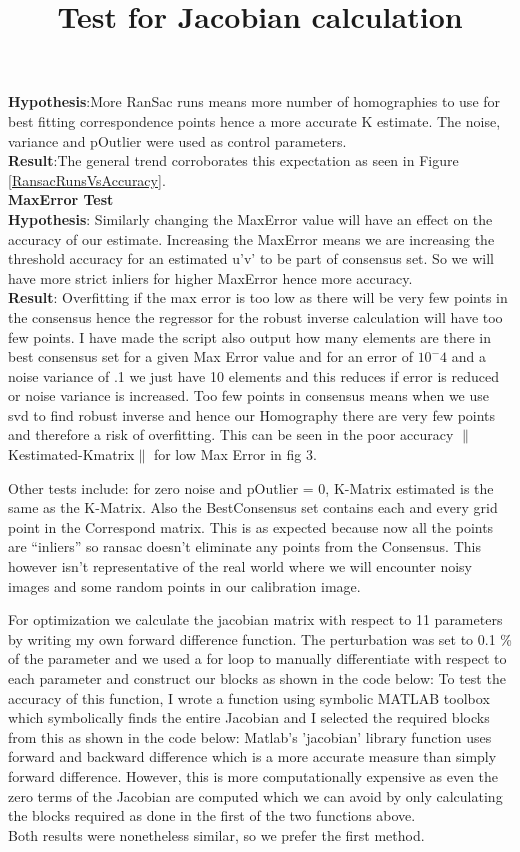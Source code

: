 \documentclass[titlepage]{article}
\begin{document}
\textbf{Hypothesis}:More RanSac runs means more number of homographies to use for best fitting correspondence points hence a more accurate K estimate. The noise, variance and pOutlier were used as control parameters. \\
\textbf{Result}:The general trend corroborates this expectation as seen in Figure \ref{RansacRunsVsAccuracy}.\\
\textbf{MaxError Test}\\
\textbf{Hypothesis}: Similarly changing the MaxError value will have an effect on the accuracy of our estimate. Increasing the MaxError means we are increasing the threshold accuracy for an estimated u'v' to be part of consensus set. So we will have more strict inliers for higher MaxError hence more accuracy.\\
\textbf{Result}: Overfitting if the max error is too low as there will be very few points in the consensus hence the regressor for the robust inverse calculation will have too few points.
I have made the script also output how many elements are there in best consensus set for a given Max Error value and for an error of $10^-4$ and a noise variance of .1 we just have 10 elements and this reduces if error is reduced or noise variance is increased. Too few points in consensus means when we use svd to find robust inverse and hence our Homography there are very few points and therefore a risk of overfitting. This can be seen in the poor accuracy $\|$Kestimated-Kmatrix$\|$ for low Max Error in fig 3.

Other tests include: for zero noise and pOutlier = 0, K-Matrix estimated is the same as the K-Matrix. Also the BestConsensus set contains each and every grid point in the Correspond matrix. This is as expected because now all the points are “inliers” so ransac doesn't eliminate any points from the Consensus. This however isn't representative of the real world where we will encounter noisy images and some random points in our calibration image.\\
\title{Test for Jacobian calculation} 
 For optimization we calculate the jacobian matrix with respect to 11 parameters by writing my own forward difference function. The perturbation was set to 0.1 \% of the parameter and we used a for loop to manually differentiate with respect to each parameter and construct our blocks as shown in the code below:
%
%
 To test the accuracy of this function, I wrote a function using symbolic MATLAB toolbox which symbolically finds the entire Jacobian and I selected the required blocks from this as shown in the code below:
%
Matlab's 'jacobian' library function uses forward and backward difference which is a more accurate measure than simply forward difference. However, this is more computationally expensive as even the zero terms of the Jacobian are computed which we can avoid by only calculating the blocks required as done in the first of the two functions above.\\
Both results were nonetheless similar, so we prefer the first method.
%
\end{document}
